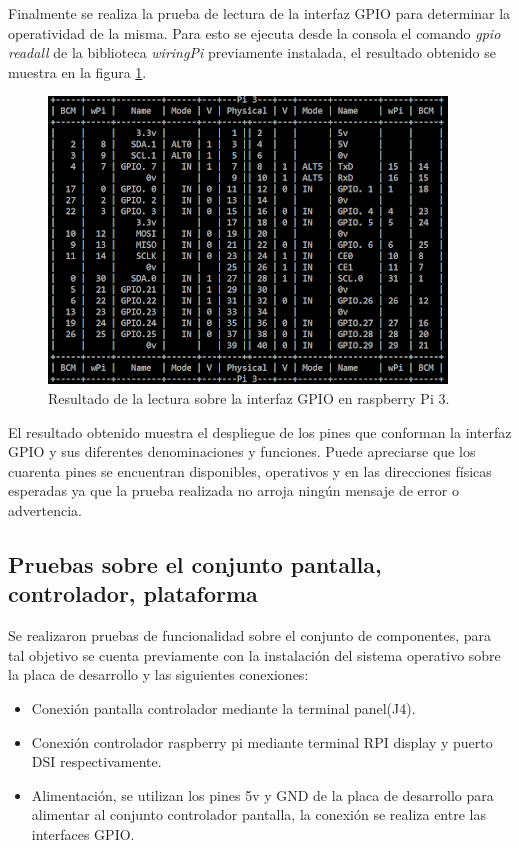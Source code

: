 Finalmente se realiza la prueba de lectura de la interfaz GPIO para determinar la operatividad de la misma. Para esto se ejecuta desde la consola el comando \textit{gpio readall} de la biblioteca \textit{wiringPi} previamente instalada, el resultado obtenido se muestra en la figura \ref{fig:readall}. 

\begin{figure}[H]
	\centering
	\includegraphics[scale =.7]{./Figures/readall.png}
	\caption{Resultado de la lectura sobre la interfaz GPIO en raspberry Pi 3.}
	\label{fig:readall}
\end{figure}

El resultado obtenido muestra el despliegue de los pines que conforman la interfaz GPIO y sus diferentes denominaciones y funciones.
Puede apreciarse que los cuarenta pines  se encuentran disponibles, operativos y  en las direcciones físicas esperadas ya que la prueba realizada no arroja ningún mensaje de error o advertencia. 

\subsection{Pruebas sobre el conjunto pantalla, controlador, plataforma}
Se realizaron pruebas de funcionalidad sobre el conjunto de componentes, para tal objetivo se cuenta previamente con la instalación del sistema operativo sobre la placa de desarrollo y las siguientes conexiones:

\begin{itemize}
\item Conexión pantalla controlador mediante la terminal panel(J4).
\item Conexión controlador raspberry pi mediante terminal RPI display y puerto DSI respectivamente.
\item Alimentación, se utilizan los pines 5v y GND de la placa de desarrollo para alimentar al conjunto controlador pantalla, la conexión se realiza entre las interfaces GPIO.
\end{itemize}

